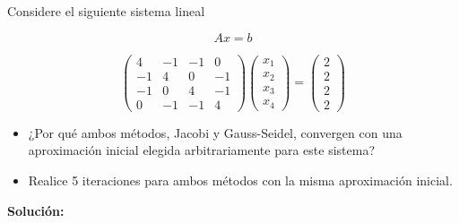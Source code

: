 Considere el siguiente sistema lineal

\begin{equation*}
    A x = b
\end{equation*}

\begin{equation*}
    \begin{pmatrix}
        4 & -1 & -1 & 0 \\
        -1 & 4 & 0 & -1 \\
        -1 & 0 & 4 & -1 \\
        0 & -1 & -1 & 4
    \end{pmatrix}
    \begin{pmatrix}
        x_1 \\
        x_2 \\
        x_3 \\
        x_4
    \end{pmatrix}    
    =    
    \begin{pmatrix}
        2 \\
        2 \\
        2 \\
        2
    \end{pmatrix}
\end{equation*}


\begin{itemize}
    \item ¿Por qué ambos métodos, Jacobi y Gauss-Seidel, convergen con una aproximación inicial elegida arbitrariamente para este sistema?
    
    \item Realice 5 iteraciones para ambos métodos con la misma aproximación inicial.
\end{itemize}

\textbf{Solución:}

